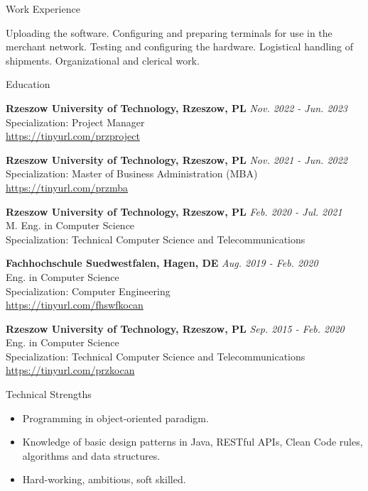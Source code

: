 \documentclass{resume}
\begin{document}
\begin{rSection}{Work Experience}
\begin{rSubsection}
        \item[] {Uploading the software. Configuring and preparing terminals for use in the merchant
                    network. Testing and configuring the hardware. Logistical handling of shipments. Organizational and clerical work.}

    \end{rSubsection}

\end{rSection}

\begin{rSection}{Education}

    {\bf Rzeszow University of Technology, Rzeszow, PL} \hfill {\em Nov. 2022 - Jun. 2023} \\
    Specialization: Project Manager \\
    \url{https://tinyurl.com/przproject}

    {\bf Rzeszow University of Technology, Rzeszow, PL} \hfill {\em Nov. 2021 - Jun. 2022} \\
    Specialization: Master of Business Administration (MBA) \\
    \url{https://tinyurl.com/przmba}

    {\bf Rzeszow University of Technology, Rzeszow, PL} \hfill {\em Feb. 2020 - Jul. 2021} \\
    M. Eng. in Computer Science \\
    Specialization: Technical Computer Science and Telecommunications

    {\bf Fachhochschule Suedwestfalen, Hagen, DE} \hfill {\em Aug. 2019 - Feb. 2020} \\
    Eng. in Computer Science \\
    Specialization: Computer Engineering \\
    \url{https://tinyurl.com/fhswfkocan}

    {\bf Rzeszow University of Technology, Rzeszow, PL} \hfill {\em Sep. 2015 - Feb. 2020} \\
    Eng. in Computer Science \\
    Specialization: Technical Computer Science and Telecommunications \\
    \url{https://tinyurl.com/przkocan}

\end{rSection}

\begin{rSection}{Technical Strengths}

    \begin{itemize}
        \item Programming in object-oriented paradigm.
        \item Knowledge of basic design patterns in Java, RESTful APIs, Clean Code rules, algorithms and data structures.
        \item Hard-working, ambitious, soft skilled.
    \end{itemize}

\end{rSection}
\end{document}
